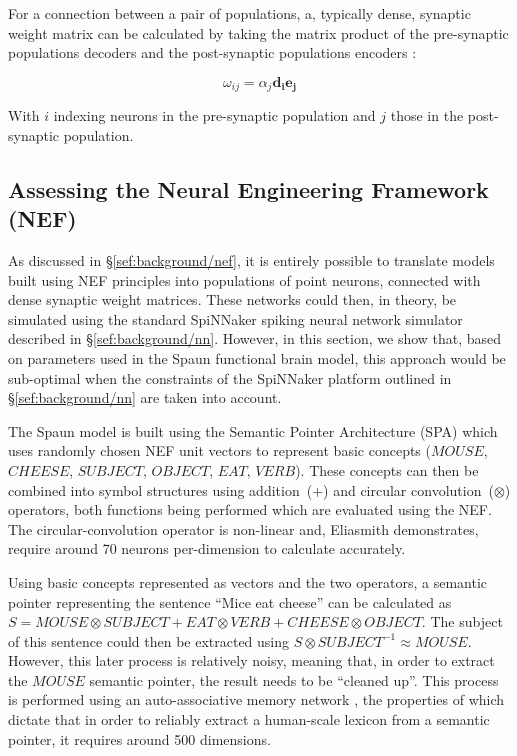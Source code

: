 \documentclass[conference]{IEEEtran}
\renewcommand{\vec}{\mathbf}  %
\begin{document}
For a connection between a pair of populations, a, typically dense, synaptic weight matrix can be calculated by taking the matrix product of the pre-synaptic populations decoders and the post-synaptic populations encoders \parencite{Stewart2014}:

\begin{equation}
  \omega_{ij} = \alpha_j \vec{d_i}\vec{e_j}  \label{eq:weights}
\end{equation}

With $i$ indexing neurons in the pre-synaptic population and $j$ those in the post-synaptic population.

  \subsection{Assessing the Neural Engineering Framework (NEF)}
  \label{sef:background/assessing}

As discussed in \S\ref{sef:background/nef}, it is entirely possible to translate models built using NEF principles into populations of point neurons, connected with dense synaptic weight matrices. These networks could then, in theory, be simulated using the standard SpiNNaker spiking neural network simulator described in \S\ref{sef:background/nn}. However, in this section, we show that, based on parameters used in the Spaun functional brain model, this approach would be sub-optimal when the constraints of the SpiNNaker platform outlined in \S\ref{sef:background/nn} are taken into account.

The Spaun model is built using the Semantic Pointer Architecture (SPA) \parencite{eliasmith2013build} which uses randomly chosen NEF unit vectors to represent basic concepts ($MOUSE$, $CHEESE$, $SUBJECT$, $OBJECT$, $EAT$, $VERB$). These concepts can then be combined into symbol structures using addition~($+$) and circular convolution~($\otimes$) operators, both functions being performed which are evaluated using the NEF. The circular-convolution operator is non-linear and, Eliasmith \parencite{eliasmith2013build} demonstrates, require around 70 neurons per-dimension to calculate accurately.

Using basic concepts represented as vectors and the two operators, a semantic pointer representing the sentence ``Mice eat cheese'' can be calculated as $S=MOUSE \otimes SUBJECT + EAT \otimes VERB + CHEESE \otimes OBJECT$. The subject of this sentence could then be extracted using $S \otimes SUBJECT^{-1} \approx MOUSE$. However, this later process is relatively noisy, meaning that, in order to extract the $MOUSE$ semantic pointer, the result needs to be ``cleaned up''. This process is performed using an auto-associative memory network \parencite{Stewart2011}, the properties of which dictate that in order to reliably extract a human-scale lexicon from a semantic pointer, it requires around 500 dimensions.
\end{document}
